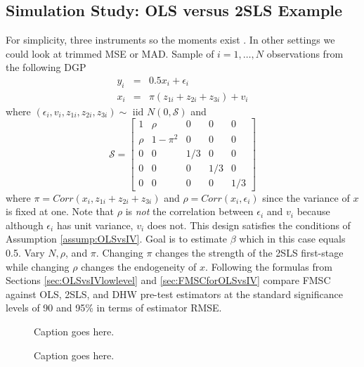 \subsection{Simulation Study: OLS versus 2SLS Example}
For simplicity, three instruments so the moments exist \citep{Phillips1980}. 
In other settings we could look at trimmed MSE or MAD.
Sample of $i = 1, \hdots, N$ observations from the following DGP 
\begin{eqnarray}
	y_i &=& 0.5 x_i + \epsilon_i\\
	x_i &=& \pi(z_{1i} + z_{2i} + z_{3i}) + v_i
\end{eqnarray}
where $(\epsilon_i, v_i, z_{1i}, z_{2i}, z_{3i}) \sim \mbox{ iid } N(0, \mathcal{S})$ and
\begin{equation}
	\mathcal{S} = \left[ \begin{array}
		{ccccc} 
		1 & \rho & 0 & 0 & 0\\
		\rho & 1 - \pi^2 & 0 & 0 & 0\\
		0 & 0 & 1/3 & 0 & 0\\
		0 & 0 & 0 & 1/3 & 0 \\
		0 & 0 & 0 & 0 & 1/3
	\end{array}\right]
\end{equation}
where $\pi = Corr(x_i, z_{1i} + z_{2i} + z_{3i})$ and $\rho = Corr(x_i,\epsilon_i)$ since the variance of $x$ is fixed at one.
Note that $\rho$ is \emph{not} the correlation between $\epsilon_i$ and $v_i$ because although $\epsilon_i$ has unit variance, $v_i$ does not.
This design satisfies the conditions of Assumption \ref{assump:OLSvsIV}.
Goal is to estimate $\beta$ which in this case equals 0.5.
Vary $N, \rho$, and $\pi$.
Changing $\pi$ changes the strength of the 2SLS first-stage while changing $\rho$ changes the endogeneity of $x$.
Following the formulas from Sections \ref{sec:OLSvsIVlowlevel} and \ref{sec:FMSCforOLSvsIV} compare FMSC against OLS, 2SLS, and DHW pre-test estimators at the standard significance levels of 90 and 95\% in terms of estimator RMSE.

\begin{figure}
\centering
	
	\caption{Caption goes here.}
\end{figure}

\begin{figure}
\centering
	
	\caption{Caption goes here.}
\end{figure}

